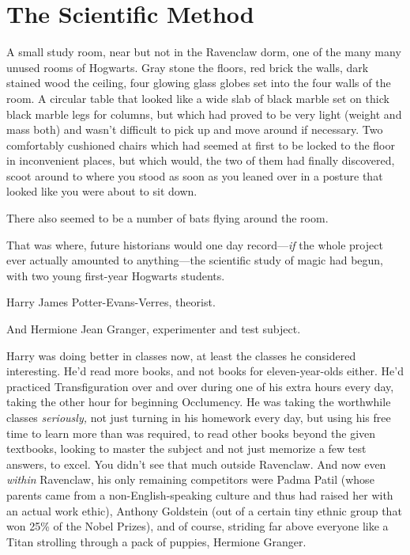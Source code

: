 \chapter{The Scientific Method}

\lettrine{A}{} small study room, near but not in the Ravenclaw dorm, one of the many many 
unused rooms of Hogwarts. Gray stone the floors, red brick the walls, dark 
stained wood the ceiling, four glowing glass globes set into the four walls of 
the room. A circular table that looked like a wide slab of black marble set on 
thick black marble legs for columns, but which had proved to be very light 
(weight and mass both) and wasn't difficult to pick up and move around if 
necessary. Two comfortably cushioned chairs which had seemed at first to be 
locked to the floor in inconvenient places, but which would, the two of them 
had finally discovered, scoot around to where you stood as soon as you leaned 
over in a posture that looked like you were about to sit down.

There also seemed to be a number of bats flying around the room.

That was where, future historians would one day record---\emph{if} the whole 
project ever actually amounted to anything---the scientific study of magic had 
begun, with two young first-year Hogwarts students.

Harry James Potter-Evans-Verres, theorist.

And Hermione Jean Granger, experimenter and test subject.

Harry was doing better in classes now, at least the classes he considered 
interesting. He'd read more books, and not books for eleven-year-olds either. 
He'd practiced Transfiguration over and over during one of his extra hours 
every day, taking the other hour for beginning Occlumency. He was taking the 
worthwhile classes \emph{seriously,} not just turning in his homework every 
day, but using his free time to learn more than was required, to read other 
books beyond the given textbooks, looking to master the subject and not just 
memorize a few test answers, to excel. You didn't see that much outside 
Ravenclaw. And now even \emph{within} Ravenclaw, his only remaining competitors 
were Padma Patil (whose parents came from a non-English-speaking culture and 
thus had raised her with an actual work ethic), Anthony Goldstein (out of a 
certain tiny ethnic group that won 25\% of the Nobel Prizes), and of course, 
striding far above everyone like a Titan strolling through a pack of puppies, 
Hermione Granger.

